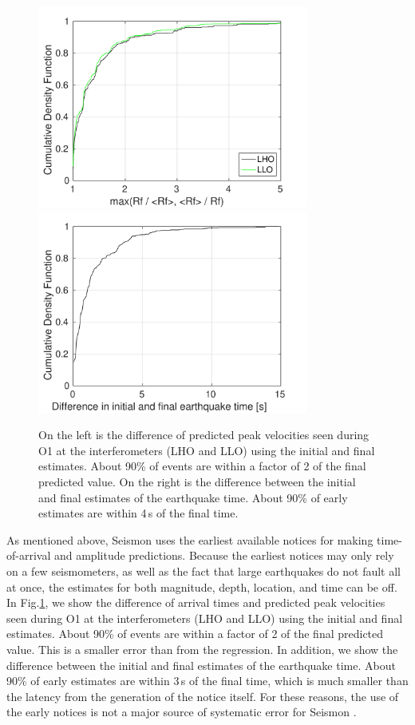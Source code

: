 \documentclass[reprint, prl, aps, showpacs]{revtex4-1}
\newcommand{\seismon}{\textnormal{Seismon }}
\begin{document}
\begin{figure}[t]
\hspace*{-0.5cm}
 \includegraphics[width=3.5in]{initial_vs_final.pdf}
 \includegraphics[width=3.5in]{lockloss_est_timediff.pdf}
 \caption{On the left is the difference of predicted peak velocities seen during O1 at the interferometers (LHO and LLO) using the initial and final estimates. About 90\% of events are within a factor of 2 of the final predicted value. On the right is the difference between the initial and final estimates of the earthquake time. About 90\% of early estimates are within 4\,s of the final time.}
 \label{fig:initialvsfinal}
\end{figure}

As mentioned above, \seismon uses the earliest available notices for making time-of-arrival and amplitude predictions.
Because the earliest notices may only rely on a few seismometers, as well as the fact that large earthquakes do not fault all at once, the estimates for both magnitude, depth, location, and time can be off.
In Fig.\ref{fig:initialvsfinal}, we show the difference of arrival times and predicted peak velocities seen during O1 at the interferometers (LHO and LLO) using the initial and final estimates. About 90\% of events are within a factor of 2 of the final predicted value. This is a smaller error than from the regression.
In addition, we show the difference between the initial and final estimates of the earthquake time. About 90\% of early estimates are within 3\,s of the final time, which is much smaller than the latency from the generation of the notice itself.
For these reasons, the use of the early notices is not a major source of systematic error for \seismon.
\end{document}
